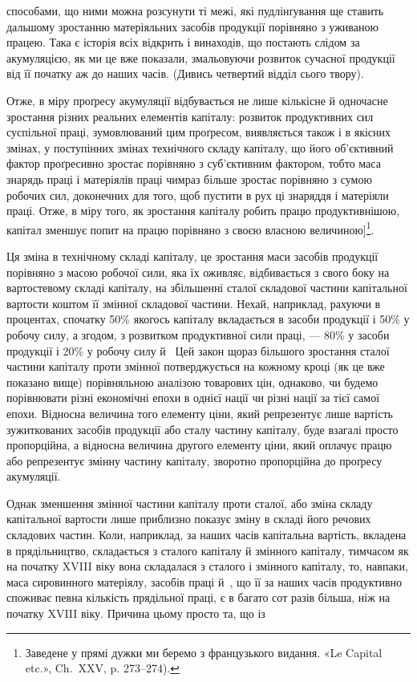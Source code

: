 \parcont{}  %
способами, що ними можна розсунути ті межі, які пудлінґування
ще ставить дальшому зростанню матеріяльних засобів продукції
порівняно з уживаною працею. Така є історія всіх відкрить
і винаходів, що постають слідом за акумуляцією, як ми це
вже показали, змальовуючи розвиток сучасної продукції від її
початку аж до наших часів. (Дивись четвертий відділ сього
твору).

Отже, в міру проґресу акумуляції відбувається не лише
кількісне й одночасне зростання різних реальних елементів
капіталу: розвиток продуктивних сил суспільної праці, зумовлюваний
цим проґресом, виявляється також і в якісних змінах,
у поступінних змінах технічного складу капіталу, що його об’єктивний
фактор проґресивно зростає порівняно з суб’єктивним
фактором, тобто маса знарядь праці і матеріялів праці чимраз
більше зростає порівняно з сумою робочих сил, доконечних для
того, щоб пустити в рух ці знаряддя і матеріяли праці. Отже,
в міру того, як зростання капіталу робить працю продуктивнішою,
капітал зменшує попит на працю порівняно з своєю власною
величиною]\footnote*{
Заведене у прямі дужки ми беремо з французького видання.
«Le Capital etc.», Ch.~XXV, p. 273--274). 
}.

Ця зміна в технічному складі капіталу, це зростання маси
засобів продукції порівняно з масою робочої сили, яка їх оживляє,
відбивається з свого боку на вартостевому складі капіталу, на
збільшенні сталої складової частини капітальної вартости коштом
її змінної складової частини. Нехай, наприклад, рахуючи
в процентах, спочатку 50\% якогось капіталу вкладається в засоби
продукції і 50\% у робочу силу, а згодом, з розвитком продуктивної
сили праці, — 80\% у засоби продукції і 20\% у робочу силу
й~ Цей закон щораз більшого зростання сталої частини капіталу
проти змінної потверджується на кожному кроці (як це вже
показано вище) порівняльною аналізою товарових цін, однаково,
чи будемо порівнювати різні економічні епохи в однієї нації
чи різні нації за тієї самої епохи. Відносна величина того елементу
ціни, який репрезентує лише вартість зужиткованих засобів
продукції або сталу частину капіталу, буде взагалі просто
пропорційна, а відносна величина другого елементу ціни, який
оплачує працю або репрезентує змінну частину капіталу, зворотно
пропорційна до проґресу акумуляції.

Однак зменшення змінної частини капіталу проти сталої,
або зміна складу капітальної вартости лише приблизно показує
зміну в складі його речових складових частин. Коли, наприклад,
за наших часів капітальна вартість, вкладена в прядільництво,
складається з  сталого капіталу й  змінного капіталу,
тимчасом як на початку XVIII віку вона складалася з  сталого
і  змінного капіталу, то, навпаки, маса сировинного матеріялу,
засобів праці й~, що її за наших часів продуктивно споживає
певна кількість прядільної праці, є в багато сот разів більша,
ніж на початку XVIII віку. Причина цьому просто та, що із
\parbreak{}  %
